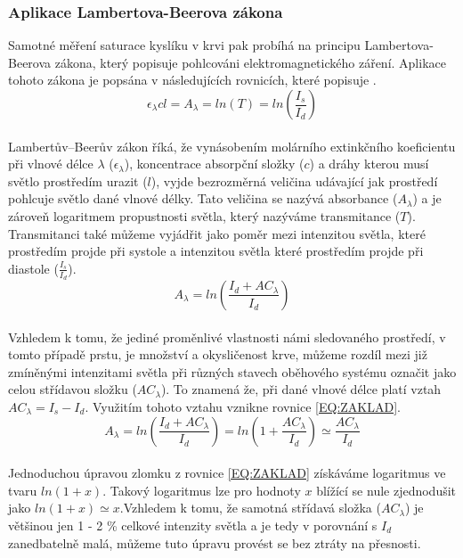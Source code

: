 \subsubsection{Aplikace Lambertova-Beerova zákona} Samotné měření saturace kyslíku v krvi pak probíhá na principu Lambertova-Beerova zákona, který popisuje pohlcováni elektromagnetického záření. Aplikace tohoto zákona je popsána v následujících rovnicích, které popisuje \cite{KYRIACOU}.
\begin{equation}
  {\epsilon_{\lambda}cl} = A_{\lambda} = ln(T) = ln(\frac{I_s}{I_d})
  \label{EQ:Lambertův–Beerův zákon}
\end{equation}\\
Lambertův–Beerův zákon říká, že vynásobením molárního extinkčního koeficientu při vlnové délce $\lambda$ ($\epsilon_{\lambda}$), koncentrace absorpční složky ($c$) a dráhy kterou musí světlo prostředím urazit ($l$), vyjde bezrozměrná veličina udávající jak prostředí pohlcuje světlo dané vlnové délky. Tato veličina se nazývá absorbance ($A_{\lambda}$) a je zároveň logaritmem propustnosti světla, který nazýváme transmitance ($T$). Transmitanci také můžeme vyjádřit jako poměr mezi intenzitou světla, které prostředím projde při systole a intenzitou světla které prostředím projde při diastole ($\frac{I_s}{I_d}$).\\
\begin{equation}
    A_{\lambda} = ln(\frac{I_d+AC_{\lambda}}{I_d})
    \label{EQ:ZAKLAD}
\end{equation}\\
Vzhledem k tomu, že jediné proměnlivé vlastnosti námi sledovaného prostředí, v tomto případě prstu, je množství a okysličenost krve, můžeme rozdíl mezi již zmíněnými intenzitami světla při různých stavech oběhového systému označit jako celou střídavou složku ($AC_{\lambda}$). To znamená že, při dané vlnové délce platí vztah $AC_{\lambda} = I_s - I_d$. Využitím tohoto vztahu vznikne rovnice \ref{EQ:ZAKLAD}.\\
\begin{equation}
    A_{\lambda} = ln(\frac{I_d+AC_{\lambda}}{I_d}) = ln(1+\frac{AC_{\lambda}}{I_d}) \simeq \frac{AC_{\lambda}}{I_d}
\end{equation}\\
Jednoduchou úpravou zlomku z rovnice \ref{EQ:ZAKLAD} získáváme logaritmus ve tvaru $ln(1+x)$. Takový logaritmus lze pro hodnoty $x$ blížící se nule zjednodušit jako $ln(1+x)\simeq x$.Vzhledem k tomu, že samotná střídavá složka ($AC_{\lambda}$) je většinou jen 1 - 2 \% celkové intenzity světla a je tedy v porovnání s $I_d$ zanedbatelně malá, můžeme tuto úpravu provést se bez ztráty na přesnosti.\\

